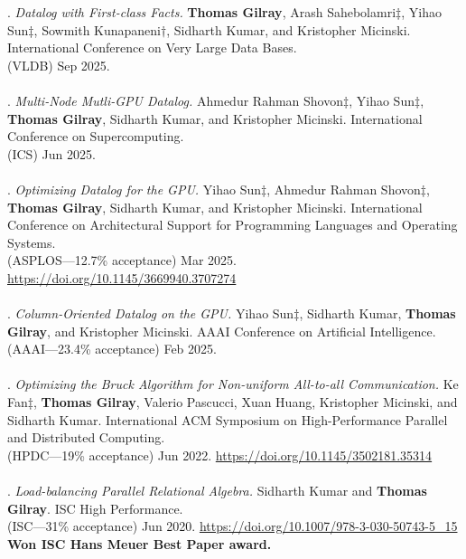 \paper. \textit{Datalog with First-class Facts.}
\textbf{Thomas Gilray}, Arash Sahebolamri$\ddagger$, Yihao Sun$\ddagger$, Sowmith Kunapaneni$\dagger$, Sidharth Kumar, and Kristopher Micinski.
International Conference on Very Large Data Bases.
\\(VLDB) Sep 2025.
\\ \vspace{-0.1cm}\\
\paper. \textit{Multi-Node Mutli-GPU Datalog.}
Ahmedur Rahman Shovon$\ddagger$, Yihao Sun$\ddagger$, \textbf{Thomas Gilray}, Sidharth Kumar, and Kristopher Micinski.
International Conference on Supercomputing.
\\(ICS) Jun 2025.
\\ \vspace{-0.1cm}\\
\paper. \textit{Optimizing Datalog for the GPU.}
Yihao Sun$\ddagger$, Ahmedur Rahman Shovon$\ddagger$, \textbf{Thomas Gilray}, Sidharth Kumar, and Kristopher Micinski.
International Conference on Architectural Support for Programming Languages and Operating Systems.
\\(ASPLOS---12.7\% acceptance) Mar 2025. \url{https://doi.org/10.1145/3669940.3707274}
\\ \vspace{-0.1cm}\\
\paper. \textit{Column-Oriented Datalog on the GPU.}
Yihao Sun$\ddagger$, Sidharth Kumar, \textbf{Thomas Gilray}, and Kristopher Micinski.
AAAI Conference on Artificial Intelligence.
\\(AAAI---23.4\% acceptance) Feb 2025.
\\ \vspace{-0.1cm}\\
\paper. \textit{Optimizing the Bruck Algorithm for Non-uniform All-to-all Communication.}
Ke Fan$\ddagger$, \textbf{Thomas Gilray}, Valerio Pascucci, Xuan Huang, Kristopher Micinski, and Sidharth Kumar.
International ACM Symposium on High-Performance Parallel and Distributed Computing.
\\(HPDC---19\% acceptance) Jun 2022. \url{https://doi.org/10.1145/3502181.35314}
\\ \vspace{-0.1cm}\\
\paper. \textit{Load-balancing Parallel Relational Algebra.}
Sidharth Kumar and \textbf{Thomas Gilray}.
ISC High Performance.
\\(ISC---31\% acceptance) Jun 2020. \url{https://doi.org/10.1007/978-3-030-50743-5_15}
\\\textbf{Won ISC Hans Meuer Best Paper award.} \\ \vspace{-0.1cm}\\

